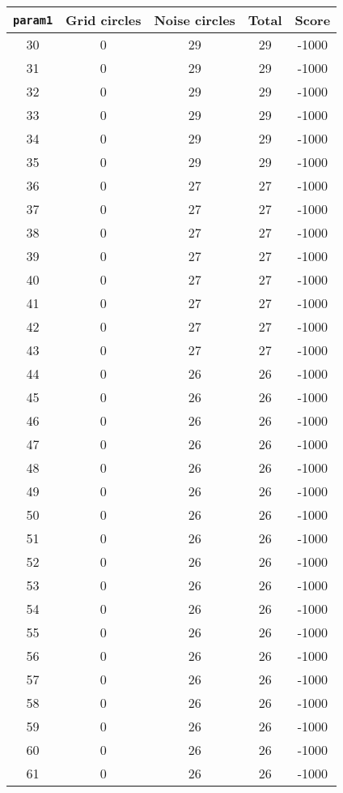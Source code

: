 \documentclass[letterpaper, 12pt]{article}
\begin{document}
\begin{longtable}{|c|c|c|c|c|}
\hline
\textbf{\texttt{param1}} & \textbf{Grid circles} & \textbf{Noise circles} & \textbf{Total} & \textbf{Score} \\
\hline
30 & 0 & 29 & 29 & -1000 \\
\hline
31 & 0 & 29 & 29 & -1000 \\
\hline
32 & 0 & 29 & 29 & -1000 \\
\hline
33 & 0 & 29 & 29 & -1000 \\
\hline
34 & 0 & 29 & 29 & -1000 \\
\hline
35 & 0 & 29 & 29 & -1000 \\
\hline
36 & 0 & 27 & 27 & -1000 \\
\hline
37 & 0 & 27 & 27 & -1000 \\
\hline
38 & 0 & 27 & 27 & -1000 \\
\hline
39 & 0 & 27 & 27 & -1000 \\
\hline
40 & 0 & 27 & 27 & -1000 \\
\hline
41 & 0 & 27 & 27 & -1000 \\
\hline
42 & 0 & 27 & 27 & -1000 \\
\hline
43 & 0 & 27 & 27 & -1000 \\
\hline
44 & 0 & 26 & 26 & -1000 \\
\hline
45 & 0 & 26 & 26 & -1000 \\
\hline
46 & 0 & 26 & 26 & -1000 \\
\hline
47 & 0 & 26 & 26 & -1000 \\
\hline
48 & 0 & 26 & 26 & -1000 \\
\hline
49 & 0 & 26 & 26 & -1000 \\
\hline
50 & 0 & 26 & 26 & -1000 \\
\hline
51 & 0 & 26 & 26 & -1000 \\
\hline
52 & 0 & 26 & 26 & -1000 \\
\hline
53 & 0 & 26 & 26 & -1000 \\
\hline
54 & 0 & 26 & 26 & -1000 \\
\hline
55 & 0 & 26 & 26 & -1000 \\
\hline
56 & 0 & 26 & 26 & -1000 \\
\hline
57 & 0 & 26 & 26 & -1000 \\
\hline
58 & 0 & 26 & 26 & -1000 \\
\hline
59 & 0 & 26 & 26 & -1000 \\
\hline
60 & 0 & 26 & 26 & -1000 \\
\hline
61 & 0 & 26 & 26 & -1000 \\

\end{longtable}
\end{document}
